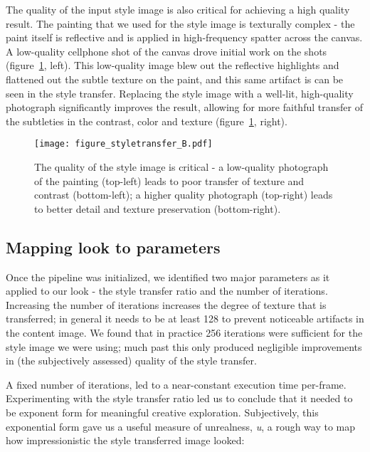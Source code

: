 \documentclass{acmsiggraph}
\begin{document}
The quality of the input style image is also critical for achieving a high quality result. The painting that we used for the style image is texturally complex - the paint itself is reflective and is applied in high-frequency spatter across the canvas. A low-quality cellphone shot of the canvas drove initial work on the shots (figure~\ref{fig:styletransfer_B}, left). This low-quality image blew out the reflective highlights and flattened out the subtle texture on the paint, and this same artifact is can be seen in the style transfer. Replacing the style image with a well-lit, high-quality photograph significantly improves the result, allowing for more faithful transfer of the subtleties in the contrast, color and texture (figure~\ref{fig:styletransfer_B}, right).

\begin{figure}[ht]
  \centering
  \texttt{[image: figure\_styletransfer\_B.pdf]}
  \caption{The quality of the style image is critical - a low-quality photograph of the painting (top-left) leads to poor transfer of texture and contrast (bottom-left); a higher quality photograph (top-right) leads to better detail and texture preservation (bottom-right).}
  \label{fig:styletransfer_B}
\end{figure}

\subsection{Mapping look to parameters}
Once the pipeline was initialized, we identified two major parameters as it applied to our look - the style transfer ratio and the number of iterations. Increasing the number of iterations increases the degree of texture that is transferred; in general it needs to be at least 128 to prevent noticeable artifacts in the content image. We found that in practice 256 iterations were sufficient for the style image we were using; much past this only produced negligible improvements in (the subjectively assessed) quality of the style transfer.

A fixed number of iterations, led to a near-constant execution time per-frame. Experimenting with the style transfer ratio led us to conclude that it needed to be exponent form for meaningful creative exploration. Subjectively, this exponential form gave us a useful measure of unrealness, \textit{u}, a rough way to map how impressionistic the style transferred image looked:
\end{document}
